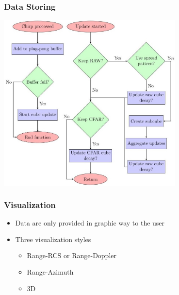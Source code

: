 \documentclass[aspectratio=43]{beamer}
\begin{document}
\begin{frame}[fragile]
  \frametitle{Data Storing}
  \begin{center}
    \includegraphics[width=0.7\textwidth]{../img/dataflow_3.jpg}
  \end{center}
\end{frame}

\begin{frame}[fragile]
  \frametitle{Visualization}
  \begin{itemize}
    \item Data are only provided in graphic way to the user
    \item Three visualization styles
      \begin{itemize}
        \item Range-RCS or Range-Doppler
        \item Range-Azimuth
        \item 3D
      \end{itemize}
  \end{itemize}
\end{frame}
\end{document}
